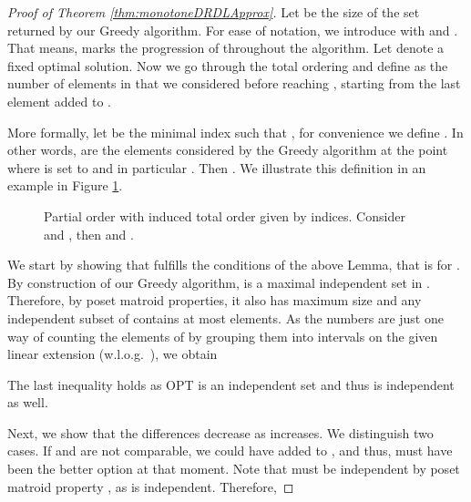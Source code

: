 \documentclass{article}
\theoremstyle{plain}
\theoremstyle{definition}
\begin{document}
\begin{proof}[Proof of Theorem \ref{thm:monotoneDRDLApprox}]
Let  be the size of the set  returned by our Greedy algorithm.  
For ease of notation, we introduce  with  and . 
That means,  marks the progression of  throughout the algorithm. Let  denote a fixed optimal solution. Now we go through
the total ordering  and define  as the number of elements in  that we considered before reaching , 
starting from the last element added to . 

More formally, let  be the minimal index such that , for convenience we define .  
In other words,  are the elements considered by the Greedy algorithm at the point where  is set to  
and in particular . 
Then . 
We illustrate this definition in an example in Figure \ref{fig:DRMatroidExample}. 

\begin{figure}[tb]
\centering
{}
\caption{Partial order with induced total order given by indices. Consider  and , then
 and .}\label{fig:DRMatroidExample}
 
\end{figure}


We start by showing that  fulfills the conditions of the above Lemma, that is  for . 
By construction of our Greedy algorithm,  is a maximal independent set in . 
Therefore, by poset matroid properties, it also has maximum size and any independent subset of  
contains at most  elements.
As the numbers  are just one way of counting the elements of  by grouping them into intervals on the given linear extension 
(w.l.o.g.\ ), we obtain
 
The last inequality holds as OPT is an independent set and thus  
 is independent as well. 

Next, we show that the differences  decrease as  increases. 
We distinguish two cases. 
If  and  are not comparable, we could have added  to , 
and thus,  must have been the better option at that moment. 
Note that  must be independent by poset matroid property , 
as  is independent. 
Therefore,  


\end{proof}
\end{document}
